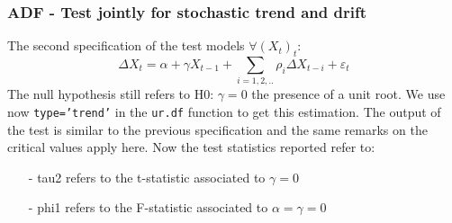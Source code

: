 \documentclass[hidelinks,12pts]{article}
\DeclareMathOperator{\1}{\mathbbm{1}}
\begin{document}
\subsubsection{ADF - Test jointly for stochastic trend and drift}
The second specification of the test models $\forall (X_t)_t$: 
    \begin{equation}
        \Delta X_t = \alpha  + \gamma X_{t-1} +\sum_{i=1,2,..}\rho_i \Delta X_{t-i} + \varepsilon_t
    \end{equation}
The null hypothesis still refers to H0: $\gamma =0$ the presence of a unit root. 
We use now \texttt{type='trend'} in the \texttt{ur.df} function to get this estimation. 
The output of the test is similar to the previous specification and the same remarks on the critical values apply here. 
Now the test statistics reported refer to: 
    \begin{itemize}
        \item[-] tau2 refers to the t-statistic associated to $\gamma =0$ 
        \item[-] phi1 refers to the F-statistic associated to $\alpha = \gamma =0$ 
    \end{itemize}

\end{document}
